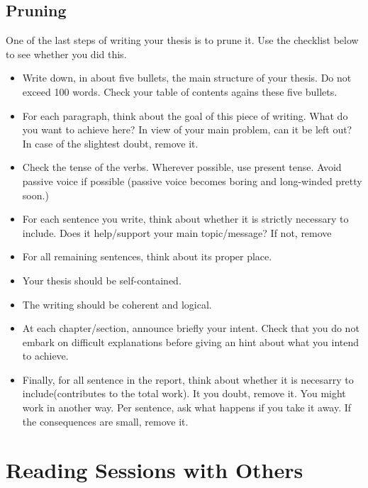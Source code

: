 \documentclass{article}
\begin{document}
\subsection{Pruning}
\label{sec:pruning}

One of the last steps of writing your thesis is to prune it. Use the
checklist below to see whether you did this.

\begin{itemize}
\item Write down, in about five bullets, the main structure of your
  thesis. Do not exceed 100 words. Check your table of contents agains
  these five bullets.
\item For each paragraph, think about the goal of this piece of
  writing. What do you want to achieve here? In view of your main
  problem, can it be left out? In case of the slightest doubt, remove
  it.
\item Check the tense of the verbs. Wherever possible, use present
  tense. Avoid passive voice if possible (passive voice becomes boring
  and long-winded pretty soon.)
\item For each sentence you write, think about whether it is strictly
  necessary to include. Does it help/support your main topic/message?
  If not, remove
\item For all remaining sentences, think about its proper place.
\item Your thesis should be self-contained.
\item The writing should be coherent and logical.
\item At each chapter/section, announce briefly your intent.  Check
  that you do not embark on difficult explanations before giving an
  hint about what you intend to achieve. 
\item Finally, for all sentence in the report, think about whether it
  is necesarry to include(contributes to the total work). It you
  doubt, remove it. You might work in another way. Per sentence, ask
  what happens if you take it away. If the consequences are small, remove it. 
\end{itemize}

\section{Reading Sessions with Others}
\label{sec:read-sess-with}
\end{document}
